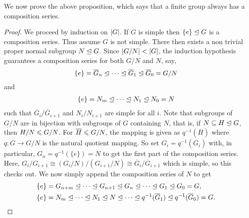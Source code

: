 We now prove the above proposition, which says that a finite group always has a composition series.
\begin{proof}
    We proceed by induction on $\left| G \right|$. If $G$ is simple then $\{e\} \trianglelefteq G$ is a composition series. Thus assume $G$ is not simple. There then exists a non trivial proper normal subgroup $N \trianglelefteq G$. Since $\left| G/N \right| < \left| G \right|$, the induction hypothesis guarantees a composition series for both $G/N$ and $N$, say,
    \begin{align}
        \{e\} = \overline{G}_{n} \trianglelefteq \cdots \trianglelefteq \overline{G}_{1} \trianglelefteq \overline{G}_{0} = G/N
    \end{align}
    and
    \begin{align}
        \{e\} = N_{m} \trianglelefteq \cdots \trianglelefteq N_{1} \trianglelefteq N_{0} = N
    \end{align}
    such that $\overline{G}_{i}/\overline{G}_{i+1}$ and $N_{i}/N_{i+1}$ are simple for all $i$. Note that subgroups of $G/N$ are in bijection with subgroups of $G$ containing $N$, that is, if $N \subseteq H \trianglelefteq G$, then $H/N \leqslant G/N$. For $\overline{H} \leqslant G/N$, the mapping is given as $q^{-1}(\overline{H})$ where $q:G \to G/N$ is the natural quotient mapping. So set $G_{i} = q^{-1}(\overline{G}_{i})$ with, in particular, $G_{n} = q^{-1}(\{e\}) = N$ to get the first part of the composition series. Here, $G_{i}/G_{i+1} \cong (G_{i}/N)/(G_{i+1}/N) \cong \overline{G}_{i}/\overline{G}_{i+1}$ which is simple, so this checks out. We now simply append the composition series of $N$ to get
    \begin{align}
        \{e\} &= G_{n+m} \trianglelefteq \cdots \trianglelefteq G_{n+1} \trianglelefteq G_{n} \trianglelefteq \cdots \trianglelefteq G_{1} \trianglelefteq G_{0} = G,\notag \\ \{e\} &= N_{m} \trianglelefteq \cdots \trianglelefteq N_{1} \trianglelefteq N \trianglelefteq \cdots \trianglelefteq q^{-1}(\overline{G}_{1}) \trianglelefteq q^{-1}(\overline{G}_{0}) = G.
    \end{align}
\end{proof}

